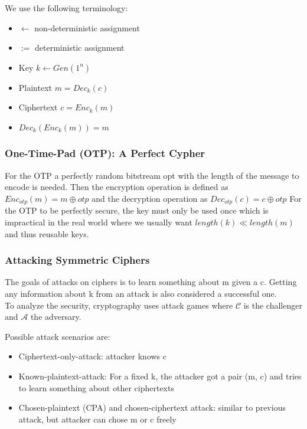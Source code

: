 We use the following terminology:
\begin{itemize}[noitemsep, topsep=0pt]
  \item $\leftarrow$ non-deterministic assignment
  \item $:=$ deterministic assignment
  \item Key $k \leftarrow Gen(1^n)$
  \item Plaintext $m = Dec_k(c)$
  \item Ciphertext $c = Enc_k(m)$
  \item $Dec_k(Enc_k(m)) = m$
\end{itemize}

\subsubsection{One-Time-Pad (OTP): A Perfect Cypher}
For the OTP a perfectly random bitstream opt with the length of the message to encode is needed.
Then the encryption operation is defined as $Enc_{otp}(m) = m \oplus otp$ and the decryption operation as $Dec_{otp}(c) = c \oplus otp$
For the OTP to be perfectly secure, the key must only be used once which is impractical in the real world where we usually want $length(k) \ll length(m)$ and thus reusable keys.

\subsubsection{Attacking Symmetric Ciphers}
The goals of attacks on ciphers is to learn something about m given a c.
Getting any information about k from an attack is also considered a successful one.\\

To analyze the security, cryptography uses attack games where $\mathcal{C}$ is the challenger and $\mathcal{A}$ the adversary.

Possible attack scenarios are:
\begin{itemize}[noitemsep, topsep=0pt]
  \item Ciphertext-only-attack: attacker knows c
  \item Known-plaintext-attack: For a fixed k, the attacker got a pair (m, c) and tries to learn something about other ciphertexts
  \item Chosen-plaintext (CPA) and chosen-ciphertext attack: similar to previous attack, but attacker can chose m or c freely
\end{itemize}
\vspace{10pt}

